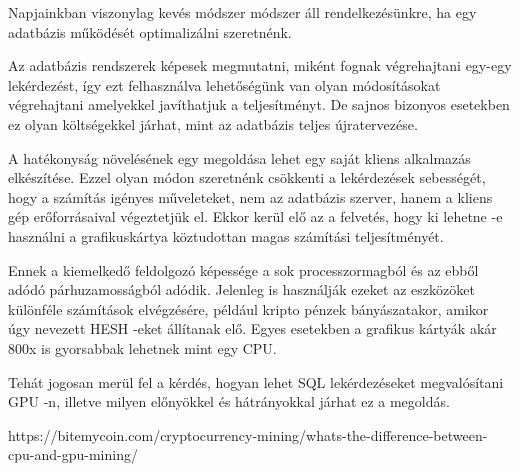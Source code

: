 
Napjainkban viszonylag kevés módszer módszer áll rendelkezésünkre, ha egy adatbázis működését optimalizálni szeretnénk.

Az adatbázis rendszerek képesek megmutatni, miként fognak végrehajtani egy-egy lekérdezést, így ezt felhasználva lehetőségünk van olyan módosításokat végrehajtani amelyekkel javíthatjuk a teljesítményt. De sajnos bizonyos esetekben ez olyan költségekkel járhat, mint az adatbázis teljes újratervezése.

A hatékonyság növelésének egy megoldása lehet egy saját kliens alkalmazás elkészítése. Ezzel olyan módon szeretnénk csökkenti a lekérdezések sebességét, hogy a számítás igényes műveleteket, nem az adatbázis szerver, hanem a kliens gép erőforrásaival végeztetjük el. Ekkor kerül elő az a felvetés, hogy ki lehetne -e használni a grafikuskártya köztudottan magas számítási teljesítményét.

Ennek a kiemelkedő feldolgozó képessége a sok processzormagból és az ebből adódó párhuzamosságból adódik. Jelenleg is használják ezeket az eszközöket különféle számítások elvégzésére, például kripto pénzek bányászatakor, amikor úgy nevezett HESH -eket állítanak elő. Egyes esetekben a grafikus kártyák akár 800x is gyorsabbak lehetnek mint egy CPU.

Tehát jogosan merül fel a kérdés, hogyan lehet SQL lekérdezéseket megvalósítani GPU -n, illetve milyen előnyökkel és hátrányokkal járhat ez a megoldás.









https://bitemycoin.com/cryptocurrency-mining/whats-the-difference-between-cpu-and-gpu-mining/


